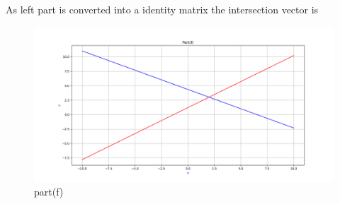\begin{enumerate}[label=\thesection.\arabic*.,ref=\thesection.\theenumi]
As left part is converted into a identity matrix the intersection vector is \\

\renewcommand{\thefigure}{\theenumi.\arabic{figure}}
\begin{figure}[!ht]
    \centering
    \includegraphics[width=\columnwidth]{./figures/A1_partf}
\caption{part(f)}
\label{fig: part(f)}
\end{figure}

\end{enumerate}


